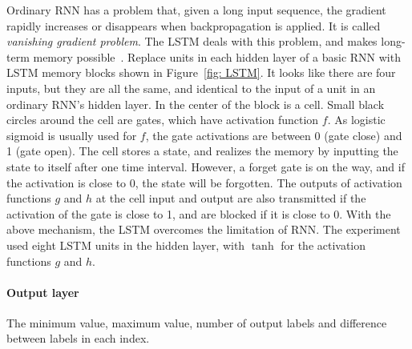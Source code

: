\documentclass[../main.tex]{subfiles}
\begin{document}
Ordinary RNN has a problem that, given a long input sequence, the gradient rapidly increases or disappears when backpropagation is applied.
It is called \emph{vanishing gradient problem}.
The LSTM deals with this problem, and makes long-term memory possible~\cite{Graves2012, 岡谷2015}.
Replace units in each hidden layer of a basic RNN with LSTM memory blocks shown in Figure~\ref{fig: LSTM}.
It looks like there are four inputs, but they are all the same, and identical to the input of a unit in an ordinary RNN's hidden layer.
In the center of the block is a cell.
Small black circles around the cell are gates, which have activation function $f$.
As logistic sigmoid is usually used for $f$, the gate activations are between 0 (gate close) and 1 (gate open).
The cell stores a state, and realizes the memory by inputting the state to itself after one time interval.
However, a forget gate is on the way, and if the activation is close to 0, the state will be forgotten.
The outputs of activation functions $g$ and $h$ at the cell input and output are also transmitted if the activation of the gate is close to 1, and are blocked if it is close to 0.
With the above mechanism, the LSTM overcomes the limitation of RNN\@.
The experiment used eight LSTM units in the hidden layer, with $\tanh$ for the activation functions $g$ and $h$.

\paragraph{Output layer}

\begin{table}
  \caption{
    The minimum value, maximum value, number of output labels and difference between labels in each index.
  }\label{tab: output label}
  \begin{center}
    
  \end{center}
\end{table}
\end{document}
